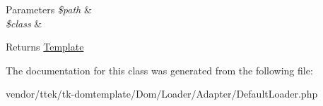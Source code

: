 \begin{DoxyParams}{Parameters}
{\em \$path} & \\
\hline
{\em \$class} & \\
\hline
\end{DoxyParams}
\begin{DoxyReturn}{Returns}
\hyperlink{classDom_1_1Template}{Template} 
\end{DoxyReturn}


The documentation for this class was generated from the following file\+:\begin{DoxyCompactItemize}
\item 
vendor/ttek/tk-\/domtemplate/\+Dom/\+Loader/\+Adapter/Default\+Loader.\+php\end{DoxyCompactItemize}
